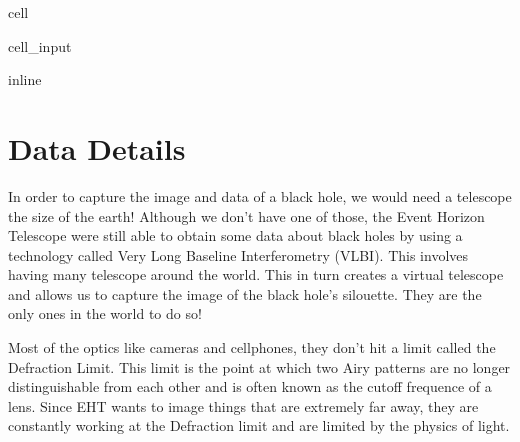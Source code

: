 \documentclass[letterpaper,10pt,english]{jupyterBook}
\begin{document}
\begin{sphinxuseclass}{cell}\begin{sphinxVerbatimInput}

\begin{sphinxuseclass}{cell_input}
\begin{sphinxVerbatim}[commandchars=\\\{\}]
   
   
 
 
    
     
   
   
 
 inline
\end{sphinxVerbatim}

\end{sphinxuseclass}\end{sphinxVerbatimInput}

\end{sphinxuseclass}

\section{Data Details}
\label{\detokenize{data:data-details}}
\sphinxAtStartPar
In order to capture the image and data of a black hole, we would need a telescope the size of the earth! Although we don’t have one of those, the Event Horizon Telescope were still able to obtain some data about black holes by using a technology called Very Long Baseline Interferometry (VLBI). This involves having many telescope around the world. This in turn creates a virtual telescope and allows us to capture the image of the black hole’s silouette. They are the only ones in the world to do so!

\sphinxAtStartPar
Most of the optics like cameras and cellphones, they don’t hit a limit called the Defraction Limit. This limit is the point at which two Airy patterns are no longer distinguishable from each other and is often known as the cutoff frequence of a lens. Since EHT wants to image things that are extremely far away, they are constantly working at the Defraction limit and are limited by the physics of light.
\end{document}
